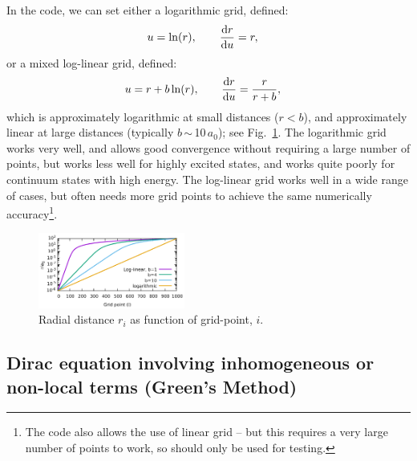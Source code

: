 \documentclass[10pt,twocolumn,a4paper]{article}%
\def\d{\ensuremath{{\rm d}}}
\begin{document}
In the code, we can set either a logarithmic grid, defined:
\begin{align}
u &= \ln(r), \qquad
\frac{\d r}{\d u} = r,
\end{align}
or a mixed log-linear grid, defined:
\begin{align}
u &= r + b \ln(r), \qquad
\frac{\d r}{\d u} = \frac{r}{r + b},
\end{align}
which is approximately logarithmic at small distances ($r<b$), and approximately linear at large distances (typically $b$\,$\sim$\,10\,$a_0$); see Fig.~\ref{Fig:grids}.
The logarithmic grid works very well, and allows good convergence without requiring a large number of points, but works less well for highly excited states, and works quite poorly for continuum states with high energy.
The log-linear grid works well in a wide range of cases, but often needs more grid points to achieve the same numerically accuracy\footnote{The code also allows the use of linear grid -- but this requires a very large number of points to work, so should only be used for testing.}.



\begin{figure}
\centering
\includegraphics[width=0.43\textwidth]{img/Grids}
\caption{\small Radial distance $r_i$ as function of grid-point, $i$.\label{Fig:grids}}
\end{figure}



\subsection{Dirac equation involving inhomogeneous or non-local terms (Green's Method)}
\end{document}
